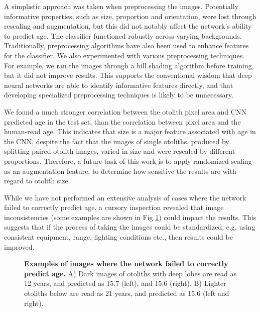 \documentclass[10pt,letterpaper]{article}
\begin{document}
A simplistic approach was taken when preprocessing the images. Potentially informative properties, such as size, proportion and orientation, were lost through rescaling and augmentation, but this did not notably affect the network's ability to predict age. The classifier functioned robustly across varying backgrounds. Traditionally, preprocessing algorithms have also been used to enhance features for the classifier. We also experimented with various preprocessing techniques. For example, we ran the images through a hill shading algorithm before training, but it did not improve results. This supports the conventional wisdom that deep neural networks are able to identify informative features directly, and that developing specialized preprocessing techniques is likely to be unnecessary.

We found a much stronger correlation between the otolith pixel area and CNN predicted age in the test set, than the correlation between pixel area and the human-read age. This indicates that size is a major feature associated with age in the CNN, despite the fact that the images of single otoliths, produced by splitting paired otolith images, varied in size and were rescaled by different proportions. Therefore, a future task of this work is to apply randomized scaling as an augmentation feature, to determine how sensitive the results are with regard to otolith size.

While we have not performed an extensive analysis of cases where the network failed to correctly predict age, a cursory inspection revealed that image inconsistencies (some examples are shown in Fig \ref{fig:mispredicted}) could impact the results. This suggests that if the process of taking the images could be standardized, e.g. using consistent equipment, range, lighting conditions etc., then results could be improved.

\begin{figure}[H]
  \centering
  \caption{\textbf{Examples of images where the network failed to correctly predict age.}  A) Dark images of otoliths with deep lobes are read as 12 years, and predicted as 15.7 (left), and 15.6 (right). B) Lighter otoliths below are read as 21 years, and predicted as 15.6 (left and right).} \label{fig:mispredicted} 
\end{figure}
    
\end{document}
